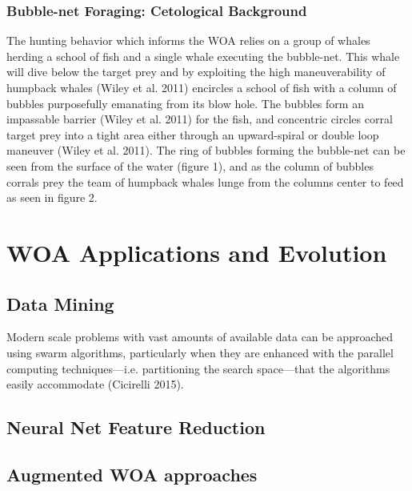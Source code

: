 \documentclass[11pt]{article}
\begin{document}
\subsubsection*{Bubble-net Foraging: Cetological Background}
The hunting behavior which informs the WOA relies on a group of whales herding a school of fish and a single whale executing the bubble-net.
This whale will dive below the target prey and by exploiting the high maneuverability of humpback whales (Wiley et al. 2011) encircles a school of fish with a column of bubbles purposefully emanating from its blow hole.
The bubbles form an impassable barrier (Wiley et al. 2011) for the fish, and concentric circles corral target prey into a tight area either through an upward-spiral or double loop maneuver (Wiley et al. 2011).
The ring of bubbles forming the bubble-net can be seen from the surface of the water (figure 1), and as the column of bubbles corrals prey the team of humpback whales lunge from the columns center to feed as seen in figure 2.

\section*{WOA Applications and Evolution}
\subsection*{Data Mining}
Modern scale problems with vast amounts of available data can be approached using swarm algorithms, particularly when they are enhanced with the parallel computing techniques---i.e. partitioning the search space---that the algorithms easily accommodate (Cicirelli 2015).
\subsection*{Neural Net Feature Reduction}
\subsection*{Augmented WOA approaches}
\end{document}
